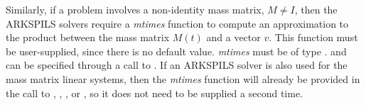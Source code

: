 \documentclass[letterpaper,10pt,english]{sphinxmanual}
\begin{document}
Similarly, if a problem involves a non-identity mass matrix,
$M\ne I$, then the ARKSPILS solvers require a \emph{mtimes} function
to compute an approximation to the product between the mass matrix
$M(t)$ and a vector $v$.  This function must be
user-supplied, since there is no default value.  \emph{mtimes} must be
of type {\hyperref[c_interface/User_supplied:ARKSpilsMassTimesVecFn]{}}.  and can be specified
through a call to  {\hyperref[c_interface/User_callable:ARKSpilsSetMassTimesVecFn]{}}.
If an ARKSPILS solver is also used for the mass matrix linear systems,
then the \emph{mtimes} function will already be provided in the call to
{\hyperref[c_interface/User_callable:ARKMassSpgmr]{}}, {\hyperref[c_interface/User_callable:ARKMassSpbcg]{}},
{\hyperref[c_interface/User_callable:ARKMassSptfqmr]{}}, {\hyperref[c_interface/User_callable:ARKMassPcg]{}} or
{\hyperref[c_interface/User_callable:ARKMassSpfgmr]{}}, so it does not need to be supplied a second
time.
\end{document}
